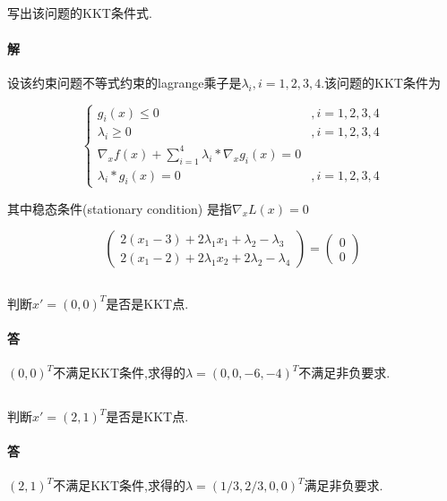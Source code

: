 \documentclass[a4paper]{article}
\begin{document}
\subsection{}
写出该问题的KKT条件式.

\paragraph{解}
设该约束问题不等式约束的lagrange乘子是$\lambda_i,i=1,2,3,4$.该问题的KKT条件为

\[\left\{\begin{array}{cl}
   g_i(x)\leq 0 & , i=1,2,3,4\\
   \lambda_i \geq 0 & ,i = 1,2,3,4\\
   \nabla_x f(x) + \sum_{i=1}^4 \lambda_i * \nabla_x g_i(x) = 0 &\\
   \lambda_i * g_i(x) = 0&,i=1,2,3,4
\end{array}\right.\]

其中稳态条件(stationary condition) 是指$\nabla_x L(x) = 0$

\[\left(\begin{array}{c}
   2(x_1-3)+ 2\lambda_1x_1 + \lambda_2 - \lambda_3\\
   2(x_1-2) + 2\lambda_1 x_2 +2\lambda_2 - \lambda_4
\end{array}\right) = \left(\begin{matrix}
   0\\0
\end{matrix}\right)\]


\subsection{}
判断\(x' = (0,0)^T\)是否是KKT点.

\paragraph{答}
$(0,0)^T$不满足KKT条件,求得的\(\lambda = (0,0,-6,-4)^T\)不满足非负要求.

\subsection{}
判断\(x' = (2,1)^T\)是否是KKT点.

\paragraph{答}
$(2,1)^T$不满足KKT条件,求得的\(\lambda = (1/3,2/3,0,0)^T\)满足非负要求.
\end{document}
